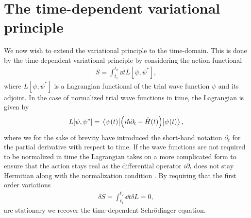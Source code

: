     \section{The time-dependent variational principle}
        \label{sec:tdvp}
        We now wish to extend the variational principle to the time-domain.
        This is done by the time-dependent variational principle by considering
        the action functional
        \begin{align}
            S = \int_{t_1}^{t_2}\dd t L[\psi, \psi^{*}],
        \end{align}
        where $L[\psi, \psi^{*}]$ is a Lagrangian functional of the trial wave
        function $\psi$ and its adjoint.
        In the case of normalized trial wave functions in time, the Lagrangian
        is given by
        \begin{align}
            L[\psi, \psi^{*}]
            =
            \mel{\psi(t)}{
                \left( 
                    i\hslash\partial_t - \hat{H}(t)
                 \right)
            }{\psi(t)},
        \end{align}
        where we for the sake of brevity have introduced the short-hand notation
        $\partial_t$ for the partial derivative with respect to time.
        If the wave functions are not required to be normalized in time the
        Lagrangian takes on a more complicated form to ensure that the action
        stays real as the differential operator $i\partial_t$ does not stay
        Hermitian along with the normalization condition
        \cite{kramer1981geometry}.
        By requiring that the first order variations
        \begin{align}
            \delta S
            = \int_{t_1}^{t_2}\dd t \delta L
            = 0,
            \label{eq:stationary-action}
        \end{align}
        are stationary we recover the time-dependent Schrödinger equation.
